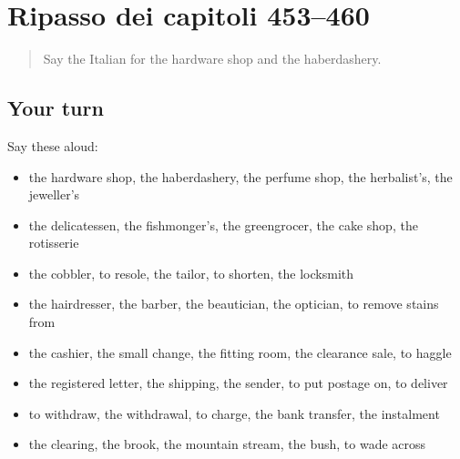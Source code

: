 \section[(dialogue)]{Ripasso dei capitoli 453–460}

\label{lesson:IT-R460-ripasso-453-460}



\begin{quote}
Say the Italian for the hardware shop and the haberdashery.
\end{quote}

\subsection*{Your turn}
Say these aloud:

\begin{itemize}
\raggedright
  \item the hardware shop, the haberdashery, the perfume shop, the herbalist's, the jeweller's
  \item the delicatessen, the fishmonger's, the greengrocer, the cake shop, the rotisserie
  \item the cobbler, to resole, the tailor, to shorten, the locksmith
  \item the hairdresser, the barber, the beautician, the optician, to remove stains from
  \item the cashier, the small change, the fitting room, the clearance sale, to haggle
  \item the registered letter, the shipping, the sender, to put postage on, to deliver
  \item to withdraw, the withdrawal, to charge, the bank transfer, the instalment
  \item the clearing, the brook, the mountain stream, the bush, to wade across
\end{itemize}

